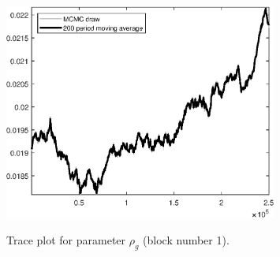 \begin{figure}[H]
\centering
  \includegraphics[width=0.8\textwidth]{BRS_imp_mobility/graphs/TracePlot_rho_g_blck_1}\\
    \caption{Trace plot for parameter ${\rho_g}$ (block number 1).}
\end{figure}
